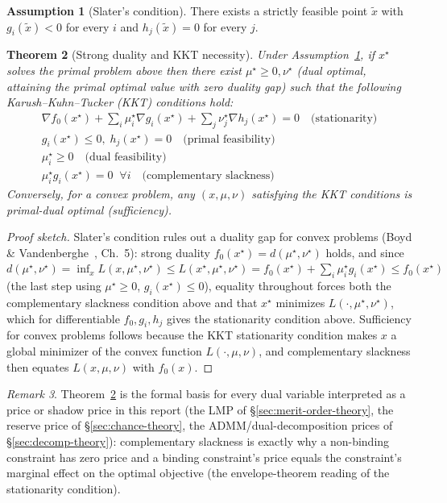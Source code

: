 \documentclass[11pt]{report}
\theoremstyle{plain}
\newtheorem{theorem}{Theorem}[chapter]
\theoremstyle{definition}
\newtheorem{assumption}[theorem]{Assumption}
\theoremstyle{remark}
\newtheorem{remark}[theorem]{Remark}
\begin{document}
\begin{assumption}[Slater's condition]
\label{as:slater}
There exists a strictly feasible point $\tilde x$ with $g_i(\tilde
x)<0$ for every $i$ and $h_j(\tilde x)=0$ for every $j$.
\end{assumption}

\begin{theorem}[Strong duality and KKT necessity]
\label{thm:strong-duality}
Under Assumption~\ref{as:slater}, if $x^\star$ solves the primal
problem above then there exist $\mu^\star\ge0,\nu^\star$ (dual
optimal, attaining the primal optimal value with zero duality gap) such
that the following Karush--Kuhn--Tucker (KKT) conditions hold:
\begin{gather}
\nabla f_0(x^\star)+\textstyle\sum_i\mu_i^\star\nabla g_i(x^\star)+\sum_j\nu_j^\star\nabla h_j(x^\star) = 0 \quad\text{(stationarity)}\\
g_i(x^\star)\le0,\; h_j(x^\star)=0 \quad\text{(primal feasibility)}\\
\mu_i^\star\ge0 \quad\text{(dual feasibility)}\\
\mu_i^\star g_i(x^\star)=0 \;\; \forall i \quad\text{(complementary slackness)}
\end{gather}
Conversely, for a convex problem, any $(x,\mu,\nu)$ satisfying the KKT
conditions is primal-dual optimal (sufficiency).
\end{theorem}
\begin{proof}[Proof sketch]
Slater's condition rules out a duality gap for convex problems (Boyd \&
Vandenberghe~\cite{boydconvex}, Ch.~5): strong duality
$f_0(x^\star)=d(\mu^\star,\nu^\star)$ holds, and since
$d(\mu^\star,\nu^\star)=\inf_x L(x,\mu^\star,\nu^\star)\le
L(x^\star,\mu^\star,\nu^\star)=f_0(x^\star)+\sum_i\mu_i^\star
g_i(x^\star)\le f_0(x^\star)$ (the last step using $\mu^\star\ge0$,
$g_i(x^\star)\le0$), equality throughout forces both the complementary
slackness condition above and that $x^\star$ minimizes
$L(\cdot,\mu^\star,\nu^\star)$, which for differentiable $f_0,g_i,h_j$
gives the stationarity condition above. Sufficiency for convex problems
follows because the KKT stationarity condition makes $x$ a global
minimizer of the convex function $L(\cdot,\mu,\nu)$, and complementary
slackness then equates $L(x,\mu,\nu)$ with $f_0(x)$.
\end{proof}

\begin{remark}
Theorem~\ref{thm:strong-duality} is the formal basis for every dual
variable interpreted as a price or shadow price in this report (the LMP
of \S\ref{sec:merit-order-theory}, the reserve price of
\S\ref{sec:chance-theory}, the ADMM/dual-decomposition prices of
\S\ref{sec:decomp-theory}): complementary slackness is exactly why a
non-binding constraint has zero price and a binding constraint's price
equals the constraint's marginal effect on the optimal objective (the
envelope-theorem reading of the stationarity condition).
\end{remark}
\end{document}

